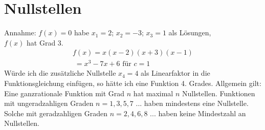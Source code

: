 \section{Nullstellen}
Annahme: $f(x) = 0$ habe $x_1 = 2$; $x_2 = -3$; $x_3 = 1$ als Lösungen,\\ $f(x)$ hat Grad 3.
\begin{gather*}
  f(x) = x(x - 2)(x + 3)(x - 1) \\
  \;= x^3 - 7x + 6 \text{ für } c = 1
\end{gather*}
Würde ich die zusätzliche Nullstelle $x_4 = 4$ als Linearfaktor in die Funktionsgleichung einfügen, so hätte ich eine Funktion 4. Grades. Allgemein gilt: Eine ganzrationale Funktion mit Grad $n$ hat maximal $n$ Nullstellen. Funktionen mit ungeradzahligen Graden $n = 1, 3, 5, 7$ ... haben mindestens eine Nullstelle. Solche mit geradzahligen Graden $n = 2, 4, 6, 8$ ... haben keine Mindestzahl an Nullstellen.
